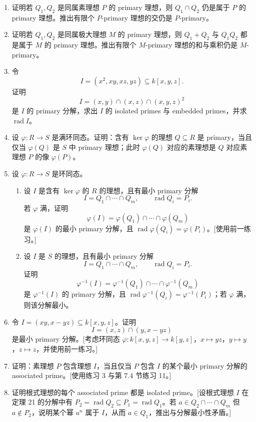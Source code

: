 \begin{enumerate}[label=\arabic*.]
	\item 证明若 $Q_1,Q_2$ 是同属素理想 $P$ 的 primary 理想，则 $Q_1\cap Q_2$ 仍是属于 $P$ 的 primary 理想。推出有限个 $P$-primary 理想的交仍是 $P$-primary。
	
	\item 证明若 $Q_1,Q_2$ 是同属极大理想 $M$ 的 primary 理想，则 $Q_1+Q_2$ 与 $Q_1Q_2$ 都是属于 $M$ 的 primary 理想。推出有限个 $M$-primary 理想的和与乘积仍是 $M$-primary。
	
	\item 令
	\[
	I=(x^2,xy,xz,yz)\subseteq k[x,y,z].
	\]
	证明
	\[
	I=(x,y)\cap(x,z)\cap(x,y,z)^2
	\]
	是 $I$ 的 primary 分解，求出 $I$ 的 isolated primes 与 embedded primes，并求 $\operatorname{rad}I$。
	
	\item 设 $\varphi:R\to S$ 是满环同态。证明：含有 $\ker\varphi$ 的理想 $Q\subseteq R$ 是 primary，当且仅当 $\varphi(Q)$ 是 $S$ 中 primary 理想；此时 $\varphi(Q)$ 对应的素理想是 $Q$ 对应素理想 $P$ 的像 $\varphi(P)$。
	
	\item 设 $\varphi:R\to S$ 是环同态。
	\begin{enumerate}[label=(\alph*)]
		\item 设 $I$ 是含有 $\ker\varphi$ 的 $R$ 的理想，且有最小 primary 分解
		\[
		I=Q_1\cap\cdots\cap Q_m,
		\qquad \operatorname{rad}Q_i=P_i.
		\]
		若 $\varphi$ 满，证明
		\[
		\varphi(I)=\varphi(Q_1)\cap\cdots\cap\varphi(Q_m)
		\]
		是 $\varphi(I)$ 的最小 primary 分解，且 $\operatorname{rad}\varphi(Q_i)=\varphi(P_i)$。[使用前一练习。]
		\item 设 $I$ 是 $S$ 的理想，且有最小 primary 分解
		\[
		I=Q_1\cap\cdots\cap Q_m,
		\qquad \operatorname{rad}Q_i=P_i.
		\]
		证明
		\[
		\varphi^{-1}(I)=\varphi^{-1}(Q_1)\cap\cdots\cap\varphi^{-1}(Q_m)
		\]
		是 $\varphi^{-1}(I)$ 的 primary 分解，且 $\operatorname{rad}\varphi^{-1}(Q_i)=\varphi^{-1}(P_i)$；若 $\varphi$ 满，则该分解最小。
	\end{enumerate}
	
	\item 令 $I=(xy,x-yz)\subseteq k[x,y,z]$。证明
	\[
	I=(x,z)\cap(y,x-yz)
	\]
	是最小 primary 分解。[考虑环同态 $\varphi:k[x,y,z]\to k[y,z]$，$x\mapsto yz$，$y\mapsto y$，$z\mapsto z$，并使用前一练习。]
	
	\item 证明：素理想 $P$ 包含理想 $I$，当且仅当 $P$ 包含 $I$ 的某个最小 primary 分解的 associated prime。[使用练习 3 与第 7.4 节练习 11。]
	
	\item 证明根式理想的每个 associated prime 都是 isolated prime。[设根式理想 $I$ 在定理 21 的分解中有 $P_2=\operatorname{rad}Q_2\subseteq P_1=\operatorname{rad}Q_1$。若 $a\in Q_2\cap\cdots\cap Q_m$ 但 $a\notin P_2$，说明某个幂 $a^n$ 属于 $I$，从而 $a\in Q_1$，推出与分解最小性矛盾。]
	

\end{enumerate}
